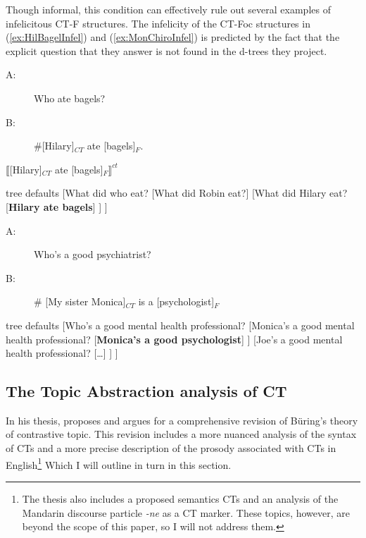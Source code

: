\documentclass[
	letterpaper,
]{article}
\begin{document}
Though informal, this condition can effectively rule out several examples of infelicitous CT-F structures.
The infelicity of the CT-Foc structures in (\ref{ex:HilBagelInfel}) and (\ref{ex:MonChiroInfel}) is predicted by the fact that the explicit question that they answer is not found in the d-trees they project. 
\begin{exe}
	\ex\label{ex:HilBagelInfel} 
	\begin{xlist}
		\ex
			\begin{description}
				\item[A:] Who ate bagels?
				\item[B:] \#[Hilary]$_{CT}$ ate [bagels]$_F$.
			\end{description}
		\ex $\llbracket$[Hilary]$_{CT}$ ate [bagels]$_F\rrbracket^{ct}$\\
		\begin{forest}
		  tree defaults
		  [What did who eat?
		    [What did Robin eat?]
		    [What did Hilary eat?
		      [\textbf{Hilary ate bagels}]
		    ]
		  ]
		\end{forest}
	\end{xlist}
	\ex\label{ex:MonChiroInfel}
	\begin{xlist}
		\ex
		\begin{description}
			\item[A:] Who's a good psychiatrist?
			\item[B:]\# [My sister Monica]$_{CT}$ is a [psychologist]$_{F}$
		\end{description}
		\ex
		\begin{forest}
		  tree defaults
		  [Who's a good mental health professional?
		    [Monica's a good mental health professional?
		      [\textbf{Monica's a good psychologist}]
		    ]
		    [Joe's a good mental health professional?
		      [\ldots]
		    ]
		  ]
		\end{forest}	
	\end{xlist}
\end{exe}

\subsection{The Topic Abstraction analysis of CT \parencite{constant2014diss}}\label{sec:Constant}
In his thesis, \textcite{constant2014diss} proposes and argues for a comprehensive revision of B\"uring's theory of contrastive topic.
This revision includes a more nuanced analysis of the syntax of CTs and a more precise description of the prosody associated with CTs in English\footnote{
	The thesis also includes a proposed semantics CTs and an analysis of the Mandarin discourse particle \textit{-ne} as a CT marker.
	These topics, however, are beyond the scope of this paper, so I will not address them.
} Which I will outline in turn in this section.
\end{document}
